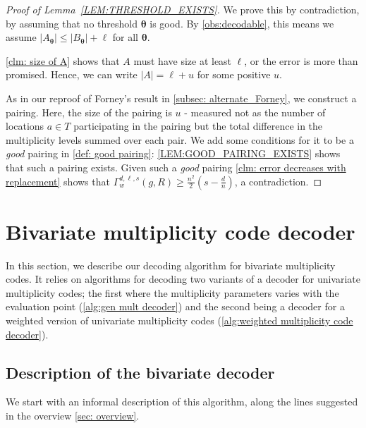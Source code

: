 \documentclass{article}
\def\abs#1{\left| #1 \right|}
\newcommand{\thetabar}{{\boldsymbol{\theta}}}
\begin{document}
	\begin{proof}[Proof of Lemma~\ref{LEM:THRESHOLD_EXISTS}]
		We prove this by contradiction, by assuming that no threshold $\thetabar$ is good. By \autoref{obs:decodable}, this means we assume $\abs{A_{\thetabar}} \leq \abs{B_{\thetabar}} + \ell$ for all $\thetabar$.
		
		
		\autoref{clm: size of A} shows that $A$ must have size at least $\ell$, or the error is more than promised. Hence, we can write $\abs{A} = \ell + u$ for some positive $u$. 
		
		As in our reproof of Forney's result in \cref{subsec: alternate_Forney}, we construct a pairing. Here, the size of the pairing is $u$ - measured not as the number of locations $a\in T$ participating in the pairing  but the total difference in the multiplicity levels summed over each pair. We add some conditions for it to be a \emph{good} pairing in \autoref{def: good pairing}: \autoref{LEM:GOOD_PAIRING_EXISTS} shows that such a pairing exists. 
		Given such a \emph{good} pairing \autoref{clm: error decreases with replacement} shows that  $\Gamma_w^{d, \ell, s}(g, R) \geq \frac{n^2}{2}(s-\frac{d}{n})$, a contradiction.
	\end{proof}
	
	
	\section{Bivariate multiplicity code decoder}
	\label{sec:bivariate}
	
	In this section, we describe our decoding
	algorithm for bivariate multiplicity codes. It relies on
	algorithms for decoding two variants of a decoder for univariate
	multiplicity codes; the first where the multiplicity parameters varies
	with the evaluation point (\cref{alg:gen mult decoder}) and the second being a decoder for a
	weighted version of univariate multiplicity codes (\cref{alg:weighted multiplicity code decoder}). 
	
	\subsection{Description of the bivariate decoder}\label{sec:bivariate_decoder}
	
	We start with an informal description of this algorithm, along the
	lines suggested in the overview \cref{sec: overview}. 
	
\end{document}
